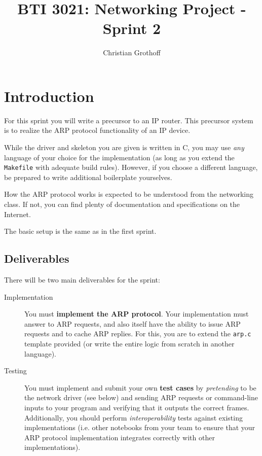 \documentclass{article}
\title{BTI 3021: Networking Project - Sprint 2}
\author{Christian Grothoff}
\date{}
\begin{document}
\maketitle

\section{Introduction}

For this sprint you will write a precursor to an IP router.  This
precursor system is to realize the ARP protocol functionality of
an IP device.

While the driver and skeleton you are given is written in C, you may
use {\em any} language of your choice for the implementation (as long
as you extend the {\tt Makefile} with adequate build rules).  However,
if you choose a different language, be prepared to write additional
boilerplate yourselves.

How the ARP protocol works is expected to be understood from the
networking class. If not, you can find plenty of documentation and
specifications on the Internet.

The basic setup is the same as in the first sprint.

\subsection{Deliverables}

There will be two main deliverables for the sprint:

\begin{description}
\item[Implementation] You must {\bf implement the ARP protocol}. Your
  implementation must answer to ARP requests, and also itself
  have the ability to issue ARP requests and to cache ARP replies.
  For this, you are to extend the {\tt arp.c} template provided
  (or write the entire logic from scratch in another language).
\item[Testing] You must implement and submit your own {\bf test cases}
  by {\em pretending} to be the network driver (see below) and sending
  ARP requests or command-line inputs to your program and verifying that it
  outputs the correct frames. Additionally, you should perform
  {\em interoperability} tests against existing
  implementations (i.e. other notebooks from your team to ensure that
  your ARP protocol implementation integrates correctly with other
  implementations).
\end{description}
\end{document}
